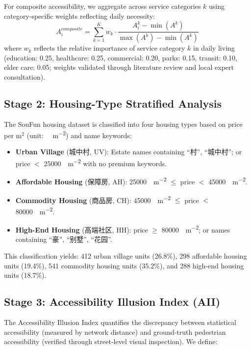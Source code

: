 \documentclass[preprint,12pt,authoryear]{elsarticle}
\begin{document}
For composite accessibility, we aggregate across service categories $k$ using category-specific weights reflecting daily necessity:
\begin{equation}
A_i^{composite} = \sum_{k=1}^{K} w_k \cdot \frac{A_i^k - \min(A^k)}{\max(A^k) - \min(A^k)}
\label{eq:composite_accessibility}
\end{equation}
where $w_k$ reflects the relative importance of service category $k$ in daily living (education: 0.25, healthcare: 0.25, commercial: 0.20, parks: 0.15, transit: 0.10, elder care: 0.05; weights validated through literature review and local expert consultation).

\subsection{Stage 2: Housing-Type Stratified Analysis}
\label{sec:housing_stratification}

The SouFun housing dataset is classified into four housing types based on price per m$^2$ (unit: \SI{}{\yuan\per\meter\squared}) and name keywords:

\begin{itemize}
    \item \textbf{Urban Village} (城中村, UV): Estate names containing ``村'', ``城中村''; or price $<$ \SI{25000}{\yuan\per\meter\squared} with no premium keywords.
    \item \textbf{Affordable Housing} (保障房, AH): \SI{25000}{\yuan\per\meter\squared} $\leq$ price $<$ \SI{45000}{\yuan\per\meter\squared}.
    \item \textbf{Commodity Housing} (商品房, CH): \SI{45000}{\yuan\per\meter\squared} $\leq$ price $<$ \SI{80000}{\yuan\per\meter\squared}.
    \item \textbf{High-End Housing} (高端社区, HH): price $\geq$ \SI{80000}{\yuan\per\meter\squared}; or names containing ``豪'', ``别墅'', ``花园''.
\end{itemize}

This classification yields: 412 urban village units (26.8\%), 298 affordable housing units (19.4\%), 541 commodity housing units (35.2\%), and 288 high-end housing units (18.7\%).

\subsection{Stage 3: Accessibility Illusion Index (AII)}
\label{sec:aii}

The Accessibility Illusion Index quantifies the discrepancy between statistical accessibility (measured by network distance) and ground-truth pedestrian accessibility (verified through street-level visual inspection). We define:
\end{document}
